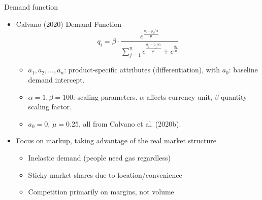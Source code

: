 \documentclass[10pt, aspectratio=169]{beamer}
\begin{document}
\begin{frame}[fragile]{Demand function}
\begin{itemize}
    \item Calvano (2020) Demand Function
    $$
q_i = \beta \cdot \frac{e^{\frac{a_i - p_i/\alpha}{\mu}}}{\sum_{j=1}^{n} e^{\frac{a_j - p_j/\alpha}{\mu}} + e^{\frac{a_0}{\mu}}}
$$
\begin{itemize}
    \item $a_1, a_2, \ldots, a_n$: product-specific attributes (differentiation), with $a_0$: baseline demand intercept.
    \item $\alpha=1, \beta=100$: scaling parameters. $\alpha$ affects currency unit, $\beta$ quantity scaling factor.
    \item $a_0 = 0$, $\mu = 0.25$, all from Calvano et al. (2020b).
\end{itemize}
    \item Focus on markup, taking advantage of the real market structure
    \begin{itemize}
        \item Inelastic demand (people need gas regardless)
        \item Sticky market shares due to location/convenience
        \item Competition primarily on margins, not volume
    \end{itemize}
\end{itemize}
  
\end{frame}




\begin{frame}{}


    
\end{frame}



%  
%  

\end{document}
